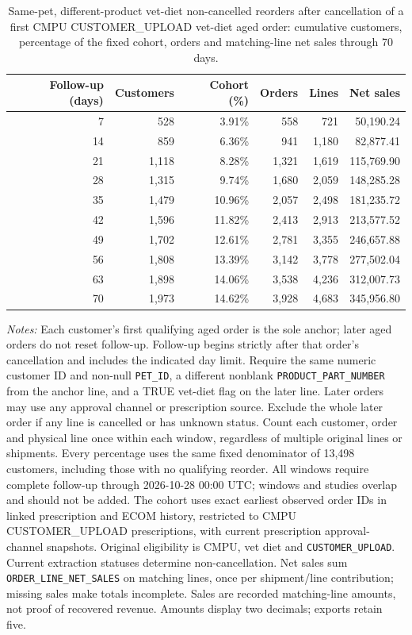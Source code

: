 \begin{table}[!htbp]
\centering
\caption{Same-pet, different-product vet-diet non-cancelled reorders after cancellation of a first CMPU CUSTOMER\_UPLOAD vet-diet aged order: cumulative customers, percentage of the fixed cohort, orders and matching-line net sales through 70 days.}
\label{tab:financial-opportunity-new-upload-same-pet-different-part}
\begin{tabular}{@{}rrrrrr@{}}
\toprule
Follow-up (days) & Customers & Cohort (\%) & Orders & Lines & Net sales \\
\midrule
7 & 528 & 3.91\% & 558 & 721 & 50,190.24 \\
14 & 859 & 6.36\% & 941 & 1,180 & 82,877.41 \\
21 & 1,118 & 8.28\% & 1,321 & 1,619 & 115,769.90 \\
28 & 1,315 & 9.74\% & 1,680 & 2,059 & 148,285.28 \\
35 & 1,479 & 10.96\% & 2,057 & 2,498 & 181,235.72 \\
42 & 1,596 & 11.82\% & 2,413 & 2,913 & 213,577.52 \\
49 & 1,702 & 12.61\% & 2,781 & 3,355 & 246,657.88 \\
56 & 1,808 & 13.39\% & 3,142 & 3,778 & 277,502.04 \\
63 & 1,898 & 14.06\% & 3,538 & 4,236 & 312,007.73 \\
70 & 1,973 & 14.62\% & 3,928 & 4,683 & 345,956.80 \\
\bottomrule
\end{tabular}

\begin{minipage}{\linewidth}
\footnotesize
\textit{Notes:} Each customer's first qualifying aged order is the sole anchor;
later aged orders do not reset follow-up. Follow-up begins strictly after that
order's cancellation and includes the indicated day limit. Require the same numeric customer ID and non-null \texttt{PET\_ID}, a different nonblank \texttt{PRODUCT\_PART\_NUMBER} from the anchor line, and a TRUE vet-diet flag on the later line. Later orders may use any approval channel or prescription
source. Exclude the whole later order if any line is cancelled or has unknown
status. Count each customer, order and physical line once within each window,
regardless of multiple original lines or shipments. Every percentage uses the
same fixed denominator of 13,498 customers, including those with no
qualifying reorder. All windows require complete follow-up through
2026-10-28 00:00 UTC; windows and studies overlap and should not be added.
The cohort uses exact earliest observed order IDs in linked prescription and
ECOM history, restricted to CMPU CUSTOMER\_UPLOAD prescriptions, with current
prescription approval-channel snapshots. Original eligibility is CMPU,
vet diet and \texttt{CUSTOMER\_UPLOAD}. Current extraction statuses determine
non-cancellation. Net sales sum \texttt{ORDER\_LINE\_NET\_SALES} on matching
lines, once per shipment/line contribution; missing sales make totals incomplete.
Sales are recorded matching-line amounts, not proof of recovered revenue.
Amounts display two decimals; exports retain five.
\end{minipage}
\end{table}

